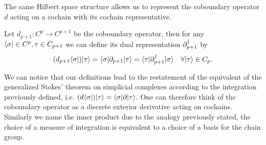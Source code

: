 \documentclass[../1.tex]{subfiles}
\begin{document}
    The same Hilbert space structure allows us to represent the coboundary operator $d$ acting on a cochain with its cochain representative.

    \begin{defn}
        Let $d_{p+1} : C^p \to C^{p+1}$ be the coboundary operator, then for any \\ $\langle \sigma | \in C^p, \tau \in C_{p+1}$ we can define its dual representation $\partial^\dagger_{p+1}$ by
        \[(d_{p+1}\langle \sigma |)| \tau \rangle = \langle \sigma | \partial_{p+1} | \tau \rangle = \langle \tau | \partial^\dagger_{p+1} | \sigma \rangle \quad \forall | \tau \rangle \in C_p. \]
    \end{defn}

    We can notice that our definitions lead to the restatement of the equivalent of the generalized Stokes' theorem on simplicial complexes
    according to the integration previously defined, i.e. $(d\langle \sigma |)| \tau \rangle = \langle \sigma |\partial| \tau \rangle$. One can therefore think of the coboundary
    operator as a discrete exterior derivative acting on cochains. Similarly we name the inner product  due to the analogy previously stated, the
    choice of a measure of integration is equivalent to a choice of a basis for the chain group.
\end{document}
